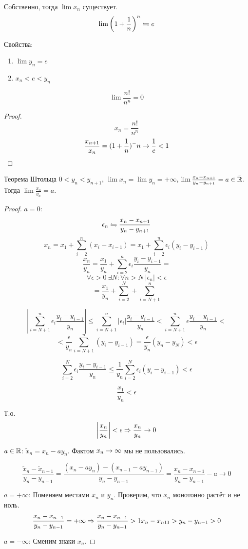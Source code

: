 Собственно, тогда $\lim x_n$ существует.
$$\lim \left(1+\frac1n\right)^n \leftrightharpoons e$$

Свойства:
\begin{enumerate}
\item $\lim y_n = e$
\item $x_n < e < y_n$
\end{enumerate}

\begin{conseq}
$$\lim \frac{n!}{n^n} = 0$$
\end{conseq}
\begin{proof}
$$x_n = \frac{n!}{n^n}$$
$$\frac{x_{n+1}}{x_n} = (1+\frac1n)^-n \rightarrow \frac1e < 1$$
\end{proof}

\begin{theorem}{Теорема Штольца}
$0<y_n<y_{n+1}$, $\lim x_n = \lim y_n = +\infty$, $\lim \frac{x_n-x_{n+1}}{y_n-y_{n+1}} = a \in \bar{\mathbb{R}}$.
Тогда $\lim \frac{x_n}{y_n} = a$.
\end{theorem}
\begin{proof}
$a = 0$:
$$\epsilon_n \leftrightharpoons \frac{x_n - x_{n+1}}{y_n - y_{n+1}}$$
$$x_n = x_1 + \sum_{i=2}^n (x_i - x_{i-1}) = x_1 + \sum_{i=2}^n \epsilon_i(y_i - y_{i-1})$$
$$\frac{x_n}{y_n} = \frac{x_1}{y_n} + \sum_{i=2}^n \epsilon_i \frac{y_i - y_{i-1}}{y_n} = $$
$$\forall \epsilon > 0\: \exists N\colon \forall n > N\: |\epsilon_n| < \epsilon$$
$$= \frac{x_1}{y_n} + \sum_{i=2}^N + \sum_{i=N+1}^n$$

$$\left|\sum_{i=N+1}^n \epsilon_i \frac{y_i - y_{i-1}}{y_n}\right| \leqslant \sum_{i=N+1}^n |\epsilon_i| \frac{y_i - y_{i-1}}{y_n} < 
\sum_{i=N+1}^n \epsilon \frac{y_i - y_{i-1}}{y_n} <$$
$$< \frac{\epsilon}{y_n}\sum_{i=N+1}^n (y_i - y_{i-1}) = \frac{\epsilon}{y_n} (y_n - y_N) < \epsilon$$

$$\sum_{i=2}^N \epsilon_i \frac{y_i - y_{i-1}}{y_n} \leqslant \frac{1}{y_n}\sum_{i=2}^N \epsilon_i(y_i - y_{i-1}) < \epsilon$$

$$\frac{x_1}{y_n} < \epsilon$$

Т.о.
$$\left|\frac{x_n}{y_n}\right| < \epsilon \Rightarrow \frac{x_n}{y_n} \rightarrow 0$$

$a\in\mathbb{R}$:
$\tilde x_n = x_n - a y_n$. Фактом $x_n\rightarrow\infty$ мы не пользовались.

$$\frac{\tilde x_n - \tilde x_{n - 1}}{y_n - y_{n - 1}} = \frac{(x_n - ay_n) - (x_{n - 1} - ay_{n - 1})}{y_n - y_{n - 1}} = \frac{x_n - x_{n - 1}}{y_n - y_{n - 1}} - a \to 0$$

$a=+\infty$: Поменяем местами $x_n$ и $y_n$. Проверим, что $x_n$ монотонно растёт и не ноль.
$$\frac{x_n - x_{n-1}}{y_n - y_{n-1}} = +\infty \Rightarrow \frac{x_n - x_{n-1}}{y_n - y_{n-1}} > 1 x_n - x_{n11} > y_n - y_{n-1} > 0$$

$a=-\infty$: Сменим знаки $x_n$.
\end{proof}

